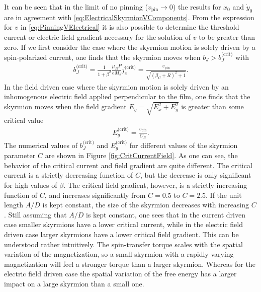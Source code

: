 It can be seen that in the limit of no pinning ($v_{\textrm{pin}} \rightarrow 0$) the results for $\dot{x}_0$ and $\dot{y}_0$ are in agreement with \eqref{eq:ElectricalSkyrmionVComponents}. From the expression for $v$ in \eqref{eq:PinningVElectrical} it is also possible to determine the threshold current or electric field gradient necessary for the solution of $v$ to be greater than zero. If we first consider the case where the skyrmion motion is solely driven by a spin-polarized current, one finds that the skyrmion moves when $b_J > b_J^{\textrm{(crit)}}$ with
\begin{align}
b_J^{\textrm{(crit)}} = \frac{1}{1+\beta^2} \frac{\mu_BP}{eM_s}j_e^{\textrm{(crit)}}= \frac{v_{\textrm{pin}}}{\sqrt{(\beta_C+R)^2+1}}.
\end{align}
In the field driven case where the skyrmion motion is solely driven by an inhomogenous electric field applied perpendicular to the film, one finds that the skyrmion moves when the field gradient $E_g = \sqrt{E_x^2+E_y^2}$ is greater than some critical value
\begin{align}
E_g^{\textrm{(crit)}} = \frac{v_{\textrm{pin}}}{C_E}.
\end{align}
The numerical values of $b_J^{\text{(crit)}}$ and $E_g^{\text{(crit)}}$ for different values of the skyrmion parameter $C$ are shown in Figure \ref{fig:CritCurrentField}. As one can see, the behavior of the critical current and field gradient are quite different. The critical current is a strictly decreasing function of $C$, but the decrease is only significant for high values of $\beta$. The critical field gradient, however, is a strictly increasing function of $C$, and increases significantly from $C = 0.5$ to $C = 2.5$. If the unit length $A/D$ is kept constant, the size of the skyrmion decreases with increasing $C$. Still assuming that $A/D$ is kept constant, one sees that in the current driven case smaller skyrmions have a lower critical current, while in the electric field driven case larger skyrmions have a lower critical field gradient. This can be understood rather intuitively. The spin-transfer torque scales with the spatial variation of the magnetization, so a small skyrmion with a rapidly varying magnetization will feel a stronger torque than a larger skyrmion. Whereas for the electric field driven case the spatial variation of the free energy has a larger impact on a large skyrmion than a small one.

